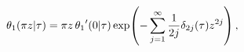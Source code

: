 \[\mathop{\theta_{1}\/}\nolimits\!\left(\pi z\middle|\tau\right)=\pi z\mathop{%
\theta_{1}\/}\nolimits'\!\left(0\middle|\tau\right)\mathop{\exp\/}\nolimits\!%
\left(-\sum_{j=1}^{\infty}\frac{1}{2j}\delta_{2j}(\tau)z^{2j}\right),\]